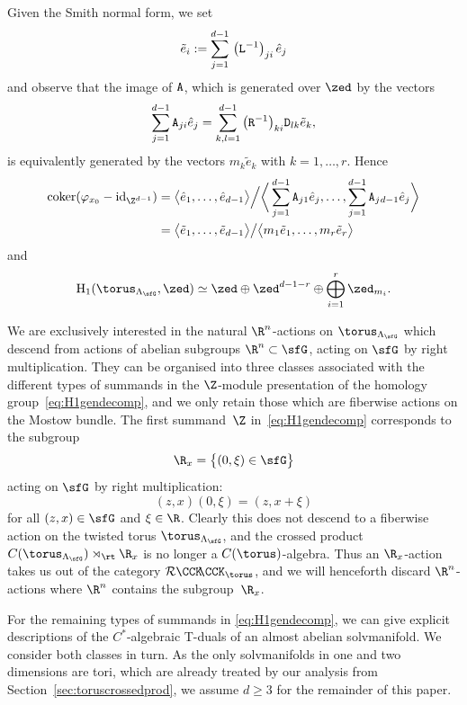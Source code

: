 Given the Smith normal form, we set
\begin{gather}\label{eq:tildeei}
\tilde e_i:=\sum_{j=1}^{d-1}\,\big({\tt L}^{-1}\big)_{ji}\,\hat e_j
\end{gather}
and observe that
the image of $\tt A$, which is generated over $\zed$ by the vectors
\[
\sum_{j=1}^{d-1} {\tt A}_{ji} \hat e_j=\sum_{k,l=1}^{d-1} \big({\tt
 R}^{-1}\big)_{ki} {\tt
 D}_{lk} \tilde e_k ,
\]
is equivalently generated by the
vectors $m_k \tilde e_k$ with $k=1,\ldots, r$.
Hence
\begin{align*}
{\rm{coker}}(\varphi_{x_0}-{\rm{id}}_{\Z^{d-1}})&=\big\langle \hat e_1, \ldots , \hat
e_{d-1}\big\rangle\Big/\bigg\langle \sum\limits_{j=1}^{d-1} {\tt A}_{j1} \hat e_j,\ldots,
 \sum\limits_{j=1}^{d-1} {\tt A}_{j\:\!d-1} \hat e_j\bigg\rangle\\
&=\big\langle \tilde e_1,
\ldots , \tilde e_{d-1}\big\rangle\big/\big\langle m_1 \tilde e_1,\ldots, m_r \tilde
e_r\big\rangle
\end{align*}
and
\begin{gather}\label{eq:H1gendecomp}
{\rm H}_1(\torus_{\Lambda_\sfG},\zed) \simeq \zed \oplus
\zed^{d-1-r} \oplus \bigoplus_{i=1}^r \zed_{m_i} .
\end{gather}

We are exclusively
interested in the natural $\R^n$-actions on $\torus_{\Lambda_\sfG}$ which descend
from actions of abelian subgroups $\R^n\subset\sfG$, acting on $\sfG$
by right multiplication. They can be
organised into three classes associated with the different types of
summands in the $\Z$-module presentation of the homology group~\eqref{eq:H1gendecomp}, and we only retain those which are fiberwise
actions on the Mostow bundle.
The first summand~$\Z$ in~\eqref{eq:H1gendecomp} corresponds to the subgroup
\[
\R_x = \big\{(0,\xi)\in\sfG\big\}
\]
acting on $\sfG$ by right multiplication:
\[
(z,x) (0,\xi) = (z,x+\xi)
\]
for all $(z,x)\in\sfG$ and $\xi\in\R$. Clearly this does not descend
to a fiberwise
action on the twisted torus $\torus_{\Lambda_\sfG}$, and the crossed
product $C(\torus_{\Lambda_\sfG})\rtimes_\rt\R_x$ is no longer a
$C(\torus)$-algebra. Thus an $\R_x$-action takes us out of the
category $\mathcal{R}\CCK\hspace{-1mm}\CCK_\torus$, and we will henceforth
discard $\R^n$-actions where $\R^n$ contains the subgroup~$\R_x$.

For the remaining types of summands in \eqref{eq:H1gendecomp}, we can
give explicit descriptions of the $C^*$-algebraic T-duals of an almost
abelian solvmanifold. We consider both classes in turn. As the only solvmanifolds in one and two dimensions are tori, which are
already treated by our analysis from
Section~\ref{sec:toruscrossedprod}, we assume $d\geq3$ for the
remainder of this paper.

